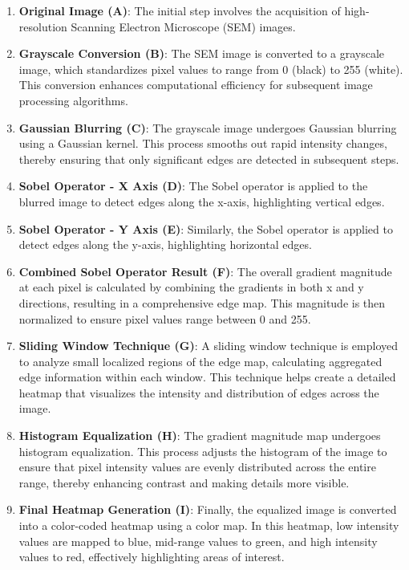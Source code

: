 \documentclass[preprint,12pt]{elsarticle}
\begin{document}
\begin{enumerate}
    \item \textbf{Original Image (A)}: The initial step involves the acquisition of high-resolution Scanning Electron Microscope (SEM) images.
    \item \textbf{Grayscale Conversion (B)}: The SEM image is converted to a grayscale image, which standardizes pixel values to range from 0 (black) to 255 (white). This conversion enhances computational efficiency for subsequent image processing algorithms.
    \item \textbf{Gaussian Blurring (C)}: The grayscale image undergoes Gaussian blurring using a Gaussian kernel. This process smooths out rapid intensity changes, thereby ensuring that only significant edges are detected in subsequent steps.
    \item \textbf{Sobel Operator - X Axis (D)}: The Sobel operator is applied to the blurred image to detect edges along the x-axis, highlighting vertical edges.
    \item \textbf{Sobel Operator - Y Axis (E)}: Similarly, the Sobel operator is applied to detect edges along the y-axis, highlighting horizontal edges.
    \item \textbf{Combined Sobel Operator Result (F)}: The overall gradient magnitude at each pixel is calculated by combining the gradients in both x and y directions, resulting in a comprehensive edge map. This magnitude is then normalized to ensure pixel values range between 0 and 255.
    \item \textbf{Sliding Window Technique (G)}: A sliding window technique is employed to analyze small localized regions of the edge map, calculating aggregated edge information within each window. This technique helps create a detailed heatmap that visualizes the intensity and distribution of edges across the image.
    \item \textbf{Histogram Equalization (H)}: The gradient magnitude map undergoes histogram equalization. This process adjusts the histogram of the image to ensure that pixel intensity values are evenly distributed across the entire range, thereby enhancing contrast and making details more visible.
    \item \textbf{Final Heatmap Generation (I)}: Finally, the equalized image is converted into a color-coded heatmap using a color map. In this heatmap, low intensity values are mapped to blue, mid-range values to green, and high intensity values to red, effectively highlighting areas of interest.
\end{enumerate}
\end{document}
